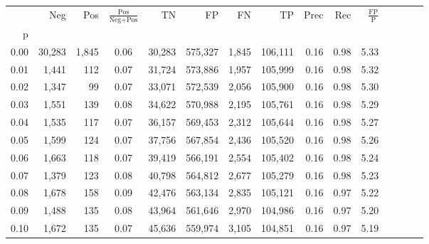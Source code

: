 \begin{tabular}{rrrcrrrrrrrrrrr}
\toprule
{} &     Neg &    Pos & $\frac{\text{Pos}}{\text{Neg}+\text{Pos}}$ &       TN &       FP &       FN &       TP &  Prec &   Rec & $\frac{\text{FP}}{\text{P}}$ \\
p    &         &        &                                            &          &          &          &          &       &       &                              \\
\midrule
0.00 &  30,283 &  1,845 &                                       0.06 &   30,283 &  575,327 &    1,845 &  106,111 &  0.16 &  0.98 &                         5.33 \\
0.01 &   1,441 &    112 &                                       0.07 &   31,724 &  573,886 &    1,957 &  105,999 &  0.16 &  0.98 &                         5.32 \\
0.02 &   1,347 &     99 &                                       0.07 &   33,071 &  572,539 &    2,056 &  105,900 &  0.16 &  0.98 &                         5.30 \\
0.03 &   1,551 &    139 &                                       0.08 &   34,622 &  570,988 &    2,195 &  105,761 &  0.16 &  0.98 &                         5.29 \\
0.04 &   1,535 &    117 &                                       0.07 &   36,157 &  569,453 &    2,312 &  105,644 &  0.16 &  0.98 &                         5.27 \\
0.05 &   1,599 &    124 &                                       0.07 &   37,756 &  567,854 &    2,436 &  105,520 &  0.16 &  0.98 &                         5.26 \\
0.06 &   1,663 &    118 &                                       0.07 &   39,419 &  566,191 &    2,554 &  105,402 &  0.16 &  0.98 &                         5.24 \\
0.07 &   1,379 &    123 &                                       0.08 &   40,798 &  564,812 &    2,677 &  105,279 &  0.16 &  0.98 &                         5.23 \\
0.08 &   1,678 &    158 &                                       0.09 &   42,476 &  563,134 &    2,835 &  105,121 &  0.16 &  0.97 &                         5.22 \\
0.09 &   1,488 &    135 &                                       0.08 &   43,964 &  561,646 &    2,970 &  104,986 &  0.16 &  0.97 &                         5.20 \\
0.10 &   1,672 &    135 &                                       0.07 &   45,636 &  559,974 &    3,105 &  104,851 &  0.16 &  0.97 &                         5.19 \\

\end{tabular}

